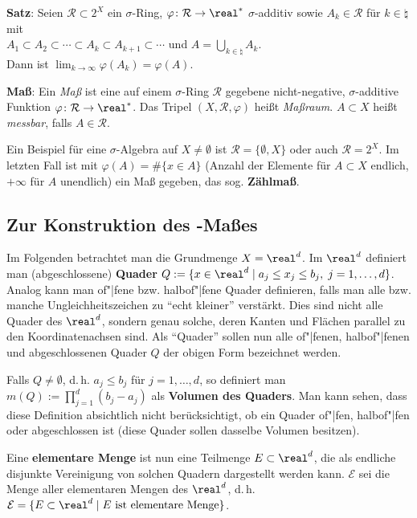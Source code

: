 \textbf{Satz}:
Seien $\mathcal{R} \subset 2^X$ ein $\sigma$-Ring,
$\varphi\colon \mathcal{R} \rightarrow \real^\ast$ $\sigma$-additiv sowie
$A_k \in \mathcal{R}$ für $k \in \natural$ mit \\
$A_1 \subset A_2 \subset \dotsb \subset A_k \subset A_{k+1} \subset \dotsb$
und $A = \bigcup_{k \in \natural} A_k$. \\
Dann ist $\lim_{k \to \infty} \varphi(A_k) = \varphi(A)$.

\linie

\textbf{Maß}:
Ein \emph{Maß} ist eine auf einem $\sigma$-Ring $\mathcal{R}$ gegebene
nicht-negative, $\sigma$-additive Funktion
$\varphi\colon \mathcal{R} \rightarrow \real^\ast$.
Das Tripel $(X, \mathcal{R}, \varphi)$ heißt \emph{Maßraum}.
$A \subset X$ heißt \emph{messbar}, falls $A \in \mathcal{R}$.

Ein Beispiel für eine $\sigma$-Algebra auf $X \not= \emptyset$ ist
$\mathcal{R} = \{\emptyset, X\}$ oder auch $\mathcal{R} = 2^X$.
Im letzten Fall ist mit $\varphi(A) = \#\{x \in A\}$ (Anzahl der Elemente für
$A \subset X$ endlich, $+\infty$ für $A$ unendlich) ein Maß gegeben, das sog.
\textbf{Zählmaß}.

\subsection{%
    Zur Konstruktion des -Maßes%
}

Im Folgenden betrachtet man die Grundmenge $X = \real^d$.
Im $\real^d$ definiert man (abgeschlossene) \textbf{Quader}
$Q := \{x \in \real^d \;|\; a_j \le x_j \le b_j,\; j = 1, \dotsc, d\}$.
Analog kann man of"|fene bzw. halb\-of"|fene Quader definieren, falls man alle
bzw. manche Ungleichheitszeichen zu "`echt kleiner"' verstärkt.
Dies sind nicht alle Quader des $\real^d$, sondern genau solche, deren Kanten
und Flächen parallel zu den Koordinatenachsen sind.
Als "`Quader"' sollen nun alle of"|fenen, halbof"|fenen und abgeschlossenen
Quader $Q$ der obigen Form bezeichnet werden.

Falls $Q \not= \emptyset$, d.\,h. $a_j \le b_j$ für $j = 1, \dotsc, d$, so
definiert man $m(Q) := \prod_{j=1}^d (b_j - a_j)$
als \textbf{Volumen des Quaders}.
Man kann sehen, dass diese Definition absichtlich nicht berücksichtigt, ob
ein Quader of"|fen, halbof"|fen oder abgeschlossen ist
(diese Quader sollen dasselbe Volumen besitzen).

Eine \textbf{elementare Menge} ist nun eine Teilmenge $E \subset \real^d$,
die als endliche disjunkte Vereinigung von solchen Quadern dargestellt werden
kann.
$\mathcal{E}$ sei die Menge aller elementaren Mengen des $\real^d$, d.\,h.
$\mathcal{E} = \{E \subset \real^d \;|\; E \text{ ist elementare Menge}\}$.

